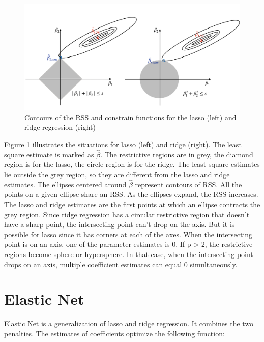 \documentclass[12pt,]{krantz}
\begin{document}
\begin{figure}

{\centering \includegraphics[width=1\linewidth]{images/LassoRidge} 

}

\caption{Contours of the RSS and constrain functions for the lasso (left) and ridge regression (right)}\label{fig:lassoridge}
\end{figure}

Figure \ref{fig:lassoridge} illustrates the situations for lasso (left) and ridge (right). The least square estimate is marked as \(\hat{\beta}\). The restrictive regions are in grey, the diamond region is for the lasso, the circle region is for the ridge. The least square estimates lie outside the grey region, so they are different from the lasso and ridge estimates. The ellipses centered around \(\hat{\beta}\) represent contours of RSS. All the points on a given ellipse share an RSS. As the ellipses expand, the RSS increases. The lasso and ridge estimates are the first points at which an ellipse contracts the grey region. Since ridge regression has a circular restrictive region that doesn't have a sharp point, the intersecting point can't drop on the axis. But it is possible for lasso since it has corners at each of the axes. When the intersecting point is on an axis, one of the parameter estimates is 0. If p \textgreater{} 2, the restrictive regions become sphere or hypersphere. In that case, when the intersecting point drops on an axis, multiple coefficient estimates can equal 0 simultaneously.

\hypertarget{elastic-net}{%
\section{Elastic Net}\label{elastic-net}}

Elastic Net is a generalization of lasso and ridge regression\citep{zou2005}. It combines the two penalties. The estimates of coefficients optimize the following function:
\end{document}
